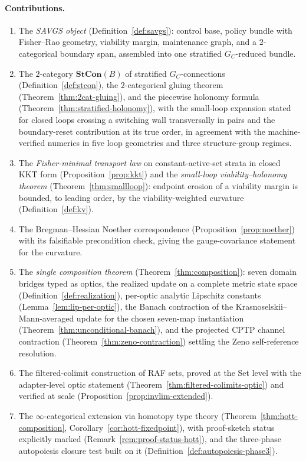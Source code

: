 \documentclass[11pt,a4paper]{article}
\theoremstyle{plain}
\theoremstyle{definition}
\theoremstyle{remark}
\begin{document}
\paragraph{Contributions.}
\begin{enumerate}[leftmargin=*,itemsep=2pt]
\item The \emph{SAVGS object}
(Definition~\ref{def:savgs}): control base, policy bundle with
Fisher--Rao geometry, viability margin, maintenance graph, and a
$2$-categorical boundary span, assembled into one stratified
$G_C$-reduced bundle.
\item The $2$-category $\mathbf{StCon}(B)$ of stratified
$G_C$-connections (Definition~\ref{def:stcon}), the
$2$-categorical gluing theorem (Theorem~\ref{thm:2cat-gluing}), and
the piecewise holonomy formula
(Theorem~\ref{thm:stratified-holonomy}), with the small-loop
expansion stated for closed loops crossing a switching wall
transversally in pairs and the boundary-reset contribution at its
true order, in agreement with the machine-verified numerics in
five loop geometries and three structure-group regimes.
\item The \emph{Fisher-minimal transport law} on
constant-active-set strata in closed KKT form
(Proposition~\ref{prop:kkt}) and the \emph{small-loop
viability--holonomy theorem} (Theorem~\ref{thm:smallloop}): endpoint
erosion of a viability margin is bounded, to leading order, by the
viability-weighted curvature
(Definition~\ref{def:kv}).
\item The Bregman--Hessian Noether correspondence
(Proposition~\ref{prop:noether}) with its falsifiable precondition
check, giving the gauge-covariance statement for the curvature.
\item The \emph{single composition theorem}
(Theorem~\ref{thm:composition}): seven domain bridges typed as
optics, the realized update on a complete metric state space
(Definition~\ref{def:realization}), per-optic analytic Lipschitz
constants (Lemma~\ref{lem:lip-per-optic}), the Banach contraction
of the Krasnoselskii--Mann-averaged update for the chosen seven-map
instantiation (Theorem~\ref{thm:unconditional-banach}), and the
projected CPTP channel contraction
(Theorem~\ref{thm:zeno-contraction}) settling the Zeno
self-reference resolution.
\item The filtered-colimit construction of RAF sets, proved at the
Set level with the adapter-level optic statement
(Theorem~\ref{thm:filtered-colimits-optic}) and verified at scale
(Proposition~\ref{prop:invlim-extended}).
\item The $\infty$-categorical extension via homotopy type theory
(Theorem~\ref{thm:hott-composition},
Corollary~\ref{cor:hott-fixedpoint}), with proof-sketch status
explicitly marked (Remark~\ref{rem:proof-status-hott}), and the
three-phase autopoiesis closure test built on it
(Definition~\ref{def:autopoiesis-phase3}).
\end{enumerate}
\end{document}
